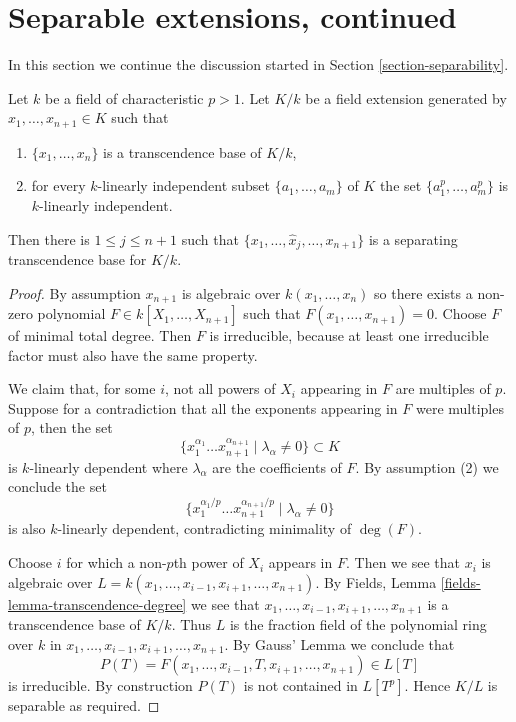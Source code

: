 \section{Separable extensions, continued}
\label{section-separability-continued}

\noindent
In this section we continue the discussion started in
Section \ref{section-separability}.

\begin{lemma}
\label{lemma-mini-separability}
Let $k$ be a field of characteristic $p > 1$. Let $K/k$
be a field extension generated by $x_1, \ldots, x_{n + 1} \in K$ such that
\begin{enumerate}
\item $\{x_1, \ldots, x_n\}$ is a transcendence base of $K/k$,
\item for every $k$-linearly independent subset
$\{a_1, \ldots, a_m\}$ of $K$ the set
$\{a^p_1, \ldots, a_m^p\}$ is $k$-linearly independent.
\end{enumerate}
Then there is $1 \leq j \leq n+1$ such that
$\{ x_1, \ldots, \widehat{x}_j, \ldots, x_{n+1}\}$
is a separating transcendence base for $K / k$.
\end{lemma}

\begin{proof}
By assumption $x_{n + 1}$ is algebraic over $k(x_1, \ldots, x_n)$
so there exists a non-zero polynomial $F \in k[X_1, \ldots, X_{n + 1}]$
such that $F(x_1, \ldots, x_{n+1}) = 0$. Choose $F$ of minimal total degree.
Then $F$ is irreducible, because at least one irreducible factor
must also have the same property.

\medskip\noindent
We claim that, for some $i$, not all powers of $X_i$ appearing in $F$
are multiples of $p$. Suppose for a contradiction that all the exponents
appearing in $F$ were multiples of $p$, then the set
$$
\{x_1^{\alpha_1} \ldots x^{\alpha_{n+1}}_{n+1} \mid \lambda_\alpha \neq 0\}
\subset
K
$$
is $k$-linearly dependent where $\lambda_\alpha$ are the coefficients of $F$.
By assumption (2) we conclude the set
$$
\{x_1^{\alpha_1 / p} \ldots x^{\alpha_{n+1} / p}_{n+1}
\mid \lambda_\alpha \neq 0 \}
$$
is also $k$-linearly dependent, contradicting minimality of $\deg(F)$.

\medskip\noindent
Choose $i$ for which a non-$p$th power of $X_i$ appears in $F$. Then we
see that $x_i$ is algebraic over
$L = k(x_1, \ldots, x_{i - 1}, x_{i + 1}, \ldots, x_{n+1})$.
By Fields, Lemma \ref{fields-lemma-transcendence-degree}
we see that $x_1, \ldots, x_{i - 1}, x_{i + 1}, \ldots, x_{n+1}$
is a transcendence base of $K/k$. Thus $L$ is the fraction field
of the polynomial ring over $k$ in
$x_1, \ldots, x_{i - 1}, x_{i + 1}, \ldots, x_{n + 1}$.
By Gauss' Lemma we conclude that
$$
P(T) =
F(x_1, \ldots, x_{i - 1}, T, x_{i + 1}, \ldots, x_{n + 1}) \in L[T]
$$
is irreducible. By construction $P(T)$ is not contained in $L[T^p]$.
Hence $K/L$ is separable as required.
\end{proof}

